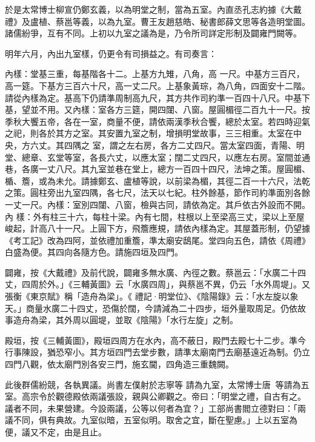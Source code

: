 \begin{pinyinscope}
 於是太常博士柳宣仍鄭玄義，以為明堂之制，當為五室。內直丞孔志約據《大戴禮》及盧植、蔡邕等義，以為九室。曹王友趙慈皓、秘書郎薛文思等各造明堂圖。諸儒紛爭，互有不同。上初以九室之議為是，乃令所司詳定形制及闢雍門闕等。



 明年六月，內出九室樣，仍更令有司損益之。有司奏言：



 內樣：堂基三重，每基階各十二。上基方九雉，八角，高
 一尺。中基方三百尺，高一筵。下基方三百六十尺，高一丈二尺。上基象黃琮，為八角，四面安十二階。請從內樣為定。基高下仍請準周制高九尺，其方共作司約準一百四十八尺。中基下基，望並不用。又內樣：室各方三筵，開四闥、八窗。屋圓楣徑二百九十一尺。按季秋大饗五帝，各在一室，商量不便，請依兩漢季秋合饗，總於太室。若四時迎氣之祀，則各於其方之室。其安置九室之制，增損明堂故事，三三相重。太室在中央，方六丈。其四隅之
 室，謂之左右房，各方二丈四尺。當太室四面，青陽、明堂、總章、玄堂等室，各長六丈，以應太室；闊二丈四尺，以應左右房。室間並通巷，各廣一丈八尺。其九室並巷在堂上，總方一百四十四尺，法坤之策。屋圓楣、楯、簷，或為未允。請據鄭玄、盧植等說，以前梁為楣，其徑二百一十六尺，法乾之策。圓柱旁出九室四隅，各七尺，法天以七紀。柱外餘基，節作司約準面別各餘一丈一尺。內樣：室別四闥、八窗，檢與古同，請依為定。其戶依古外設而不開。內
 樣：外有柱三十六，每柱十梁。內有七間，柱根以上至梁高三丈，梁以上至屋峻起，計高八十一尺。上圓下方，飛簷應規，請依內樣為定。其屋蓋形制，仍望據《考工記》改為四阿，並依禮加重簷，準太廟安鴟尾。堂四向五色，請依《周禮》白盛為便。其四向各隨方色。請施四垣及四門。



 闢雍，按《大戴禮》及前代說，闢雍多無水廣、內徑之數。蔡邕云：「水廣二十四丈，四周於外。」《三輔黃圖》云「水廣四周」，與蔡邕不異，仍云「水外周堤」。又張衡《東京賦》稱「造舟為梁」。《
 禮記·明堂位》、《陰陽錄》云：「水左旋以象天。」商量水廣二十四丈，恐傷於闊，今請減為二十四步，垣外量取周足。仍依故事造舟為梁，其外周以圓堤，並取《陰陽》「水行左旋」之制。



 殿垣，按《三輔黃圖》，殿垣四周方在水內，高不蔽日，殿門去殿七十二步。準今行事陳設，猶恐窄小。其方垣四門去堂步數，請準太廟南門去廟基遠近為制。仍立四門八觀，依太廟門別各安三門，施玄閫，四角造三重魏闕。



 此後群儒紛競，各執異議。尚書左僕射於志寧等
 請為九室，太常博士唐等請為五室。高宗令於觀德殿依兩議張設，親與公卿觀之。帝曰：「明堂之禮，自古有之。議者不同，未果營建。今設兩議，公等以何者為宜？」工部尚書閻立德對曰：「兩議不同，俱有典故。九室似暗，五室似明。取舍之宜，斷在聖慮。」上以五室為便，議又不定，由是且止。




\end{pinyinscope}
